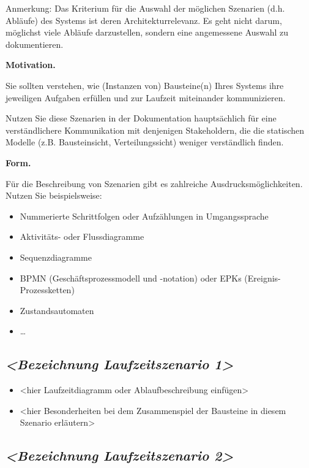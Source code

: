 \documentclass[]{article}
\begin{document}
Anmerkung: Das Kriterium für die Auswahl der möglichen Szenarien (d.h.
Abläufe) des Systems ist deren Architekturrelevanz. Es geht nicht darum,
möglichst viele Abläufe darzustellen, sondern eine angemessene Auswahl
zu dokumentieren.

\textbf{Motivation.}

Sie sollten verstehen, wie (Instanzen von) Bausteine(n) Ihres Systems
ihre jeweiligen Aufgaben erfüllen und zur Laufzeit miteinander
kommunizieren.

Nutzen Sie diese Szenarien in der Dokumentation hauptsächlich für eine
verständlichere Kommunikation mit denjenigen Stakeholdern, die die
statischen Modelle (z.B. Bausteinsicht, Verteilungssicht) weniger
verständlich finden.

\textbf{Form.}

Für die Beschreibung von Szenarien gibt es zahlreiche
Ausdrucksmöglichkeiten. Nutzen Sie beispielsweise:

\begin{itemize}
\item
  Nummerierte Schrittfolgen oder Aufzählungen in Umgangssprache
\item
  Aktivitäts- oder Flussdiagramme
\item
  Sequenzdiagramme
\item
  BPMN (Geschäftsprozessmodell und -notation) oder EPKs
  (Ereignis-Prozessketten)
\item
  Zustandsautomaten
\item
  \ldots{}
\end{itemize}

\hypertarget{__emphasis_bezeichnung_laufzeitszenario_1_emphasis}{%
\subsection{\texorpdfstring{\emph{\textless{}Bezeichnung
Laufzeitszenario
1\textgreater{}}}{\textless{}Bezeichnung Laufzeitszenario 1\textgreater{}}}\label{__emphasis_bezeichnung_laufzeitszenario_1_emphasis}}

\begin{itemize}
\item
  \textless{}hier Laufzeitdiagramm oder Ablaufbeschreibung
  einfügen\textgreater{}
\item
  \textless{}hier Besonderheiten bei dem Zusammenspiel der Bausteine in
  diesem Szenario erläutern\textgreater{}
\end{itemize}

\hypertarget{__emphasis_bezeichnung_laufzeitszenario_2_emphasis}{%
\subsection{\texorpdfstring{\emph{\textless{}Bezeichnung
Laufzeitszenario
2\textgreater{}}}{\textless{}Bezeichnung Laufzeitszenario 2\textgreater{}}}\label{__emphasis_bezeichnung_laufzeitszenario_2_emphasis}}
\end{document}
